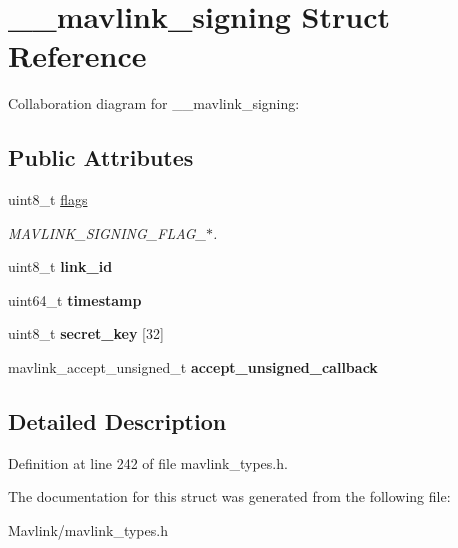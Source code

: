 \hypertarget{struct____mavlink__signing}{}\section{\+\_\+\+\_\+mavlink\+\_\+signing Struct Reference}
\label{struct____mavlink__signing}


Collaboration diagram for \+\_\+\+\_\+mavlink\+\_\+signing\+:
\subsection*{Public Attributes}
\begin{DoxyCompactItemize}
\item 
\hypertarget{struct____mavlink__signing_a5e08957249da64329f7ee29c1c503516}{}\label{struct____mavlink__signing_a5e08957249da64329f7ee29c1c503516} 
uint8\+\_\+t \hyperlink{struct____mavlink__signing_a5e08957249da64329f7ee29c1c503516}{flags}
\begin{DoxyCompactList}\small\item\em M\+A\+V\+L\+I\+N\+K\+\_\+\+S\+I\+G\+N\+I\+N\+G\+\_\+\+F\+L\+A\+G\+\_\+$\ast$. \end{DoxyCompactList}\item 
\hypertarget{struct____mavlink__signing_a03d44bb3079f7af6924d6868846ccc57}{}\label{struct____mavlink__signing_a03d44bb3079f7af6924d6868846ccc57} 
uint8\+\_\+t {\bfseries link\+\_\+id}
\item 
\hypertarget{struct____mavlink__signing_ac6010de27e406777d336935ba93ddac1}{}\label{struct____mavlink__signing_ac6010de27e406777d336935ba93ddac1} 
uint64\+\_\+t {\bfseries timestamp}
\item 
\hypertarget{struct____mavlink__signing_ade31cece3d550b1bf2e41c9c38b9964f}{}\label{struct____mavlink__signing_ade31cece3d550b1bf2e41c9c38b9964f} 
uint8\+\_\+t {\bfseries secret\+\_\+key} \mbox{[}32\mbox{]}
\item 
\hypertarget{struct____mavlink__signing_a74f675ae2e09c5a793c06d5005cd7d1b}{}\label{struct____mavlink__signing_a74f675ae2e09c5a793c06d5005cd7d1b} 
mavlink\+\_\+accept\+\_\+unsigned\+\_\+t {\bfseries accept\+\_\+unsigned\+\_\+callback}
\end{DoxyCompactItemize}


\subsection{Detailed Description}


Definition at line 242 of file mavlink\+\_\+types.\+h.



The documentation for this struct was generated from the following file\+:\begin{DoxyCompactItemize}
\item 
Mavlink/mavlink\+\_\+types.\+h\end{DoxyCompactItemize}
